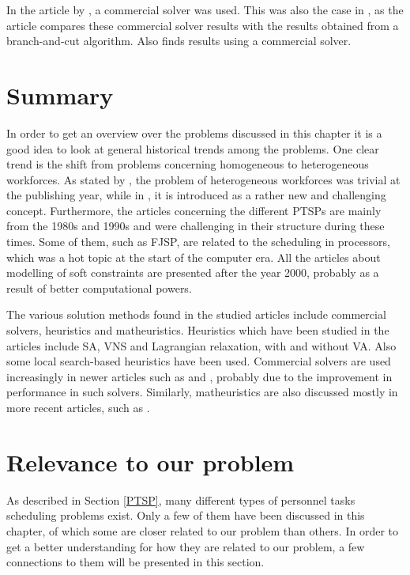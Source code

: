 In the article by \citet{eiselt_2008}, a commercial solver was used. This was also the case in \citet{mohan_2008}, as the article compares these commercial solver results with the results obtained from a branch-and-cut algorithm. Also \cite{shahnazari_2013} finds results using a commercial solver.

\section{Summary}

In order to get an overview over the problems discussed in this chapter it is a good idea to look at general historical trends among the problems. One clear trend is the shift from problems concerning homogeneous to heterogeneous workforces. As stated by \citet{krishnamoorthy_2012}, the problem of heterogeneous workforces was trivial at the publishing year, while in \citet{loucks_1991}, it is introduced as a rather new and challenging concept. Furthermore, the articles concerning the different PTSPs are mainly from the 1980s and 1990s and were challenging in their structure during these times. Some of them, such as FJSP, are related to the scheduling in processors, which was a hot topic at the start of the computer era. All the articles about modelling of soft constraints are presented after the year 2000, probably as a result of better computational powers.

The various solution methods found in the studied articles include commercial solvers, heuristics and matheuristics. Heuristics which have been studied in the articles include SA, VNS and Lagrangian relaxation, with and without VA. Also some local search-based heuristics have been used. Commercial solvers are used increasingly in newer articles such as \citet{hojati_2011} and \citet{mohan_2008}, probably due to the improvement in performance in such solvers. Similarly, matheuristics are also discussed mostly in more recent articles, such as \citet{akbari_2013}. 

\section{Relevance to our problem}

As described in Section \ref{PTSP}, many different types of personnel tasks scheduling problems exist. Only a few of them have been discussed in this chapter, of which some are closer related to our problem than others. In order to get a better understanding for how they are related to our problem, a few connections to them will be presented in this section.

